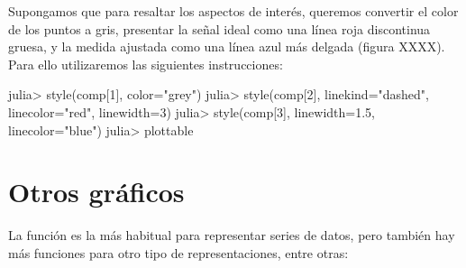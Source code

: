 Supongamos que para resaltar los aspectos de interés, queremos convertir el color de los puntos a gris, presentar la señal ideal como una línea roja discontinua gruesa, y la medida ajustada como una línea azul más delgada (figura XXXX). Para ello utilizaremos las siguientes instrucciones:

\begin{jlconcode}
julia> style(comp[1], color="grey")
julia> style(comp[2], linekind="dashed", linecolor="red", linewidth=3)
julia> style(comp[3], linewidth=1.5, linecolor="blue")
julia> plottable
\end{jlconcode}

\section{Otros gráficos}

La función  es la más habitual para representar series de datos, pero también hay más funciones para otro tipo de representaciones, entre otras:

